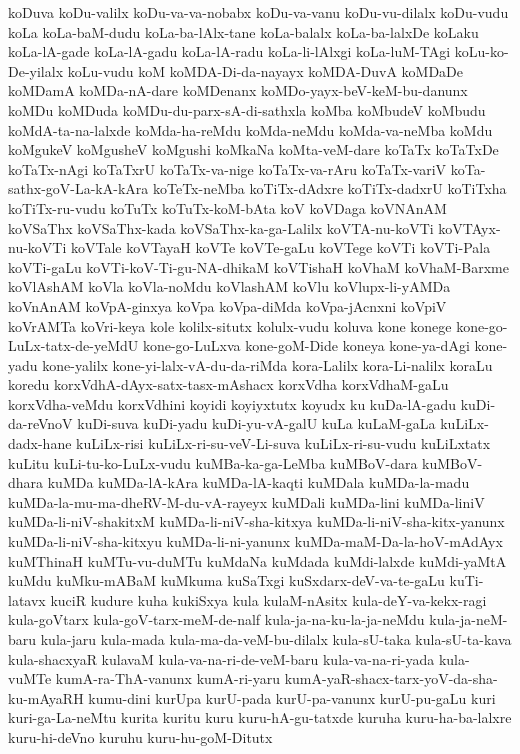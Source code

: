 {koDuva
koDu-valilx
koDu-va-va-nobabx
koDu-va-vanu
koDu-vu-dilalx
koDu-vudu
koLa
koLa-baM-dudu
koLa-ba-lAlx-tane
koLa-balalx
koLa-ba-lalxDe
koLaku
koLa-lA-gade
koLa-lA-gadu
koLa-lA-radu
koLa-li-lAlxgi
koLa-luM-TAgi
koLu-ko-De-yilalx
koLu-vudu
koM
koMDA-Di-da-nayayx
koMDA-DuvA
koMDaDe
koMDamA
koMDa-nA-dare
koMDenanx
koMDo-yayx-beV-keM-bu-danunx
koMDu
koMDuda
koMDu-du-parx-sA-di-sathxla
koMba
koMbudeV
koMbudu
koMdA-ta-na-lalxde
koMda-ha-reMdu
koMda-neMdu
koMda-va-neMba
koMdu
koMgukeV
koMgusheV
koMgushi
koMkaNa
koMta-veM-dare
koTaTx
koTaTxDe
koTaTx-nAgi
koTaTxrU
koTaTx-va-nige
koTaTx-va-rAru
koTaTx-variV
koTa-sathx-goV-La-kA-kAra
koTeTx-neMba
koTiTx-dAdxre
koTiTx-dadxrU
koTiTxha
koTiTx-ru-vudu
koTuTx
koTuTx-koM-bAta
koV
koVDaga
koVNAnAM
koVSaThx
koVSaThx-kada
koVSaThx-ka-ga-Lalilx
koVTA-nu-koVTi
koVTAyx-nu-koVTi
koVTale
koVTayaH
koVTe
koVTe-gaLu
koVTege
koVTi
koVTi-Pala
koVTi-gaLu
koVTi-koV-Ti-gu-NA-dhikaM
koVTishaH
koVhaM
koVhaM-Barxme
koVlAshAM
koVla
koVla-noMdu
koVlashAM
koVlu
koVlupx-li-yAMDa
koVnAnAM
koVpA-ginxya
koVpa
koVpa-diMda
koVpa-jAcnxni
koVpiV
koVrAMTa
koVri-keya
kole
kolilx-situtx
kolulx-vudu
koluva
kone
konege
kone-go-LuLx-tatx-de-yeMdU
kone-go-LuLxva
kone-goM-Dide
koneya
kone-ya-dAgi
kone-yadu
kone-yalilx
kone-yi-lalx-vA-du-da-riMda
kora-Lalilx
kora-Li-nalilx
koraLu
koredu
korxVdhA-dAyx-satx-tasx-mAshacx
korxVdha
korxVdhaM-gaLu
korxVdha-veMdu
korxVdhini
koyidi
koyiyxtutx
koyudx
ku
kuDa-lA-gadu
kuDi-da-reVnoV
kuDi-suva
kuDi-yadu
kuDi-yu-vA-galU
kuLa
kuLaM-gaLa
kuLiLx-dadx-hane
kuLiLx-risi
kuLiLx-ri-su-veV-Li-suva
kuLiLx-ri-su-vudu
kuLiLxtatx
kuLitu
kuLi-tu-ko-LuLx-vudu
kuMBa-ka-ga-LeMba
kuMBoV-dara
kuMBoV-dhara
kuMDa
kuMDa-lA-kAra
kuMDa-lA-kaqti
kuMDala
kuMDa-la-madu
kuMDa-la-mu-ma-dheRV-M-du-vA-rayeyx
kuMDali
kuMDa-lini
kuMDa-liniV
kuMDa-li-niV-shakitxM
kuMDa-li-niV-sha-kitxya
kuMDa-li-niV-sha-kitx-yanunx
kuMDa-li-niV-sha-kitxyu
kuMDa-li-ni-yanunx
kuMDa-maM-Da-la-hoV-mAdAyx
kuMThinaH
kuMTu-vu-duMTu
kuMdaNa
kuMdada
kuMdi-lalxde
kuMdi-yaMtA
kuMdu
kuMku-mABaM
kuMkuma
kuSaTxgi
kuSxdarx-deV-va-te-gaLu
kuTi-latavx
kuciR
kudure
kuha
kukiSxya
kula
kulaM-nAsitx
kula-deY-va-kekx-ragi
kula-goVtarx
kula-goV-tarx-meM-de-nalf
kula-ja-na-ku-la-ja-neMdu
kula-ja-neM-baru
kula-jaru
kula-mada
kula-ma-da-veM-bu-dilalx
kula-sU-taka
kula-sU-ta-kava
kula-shacxyaR
kulavaM
kula-va-na-ri-de-veM-baru
kula-va-na-ri-yada
kula-vuMTe
kumA-ra-ThA-vanunx
kumA-ri-yaru
kumA-yaR-shacx-tarx-yoV-da-sha-ku-mAyaRH
kumu-dini
kurUpa
kurU-pada
kurU-pa-vanunx
kurU-pu-gaLu
kuri
kuri-ga-La-neMtu
kurita
kuritu
kuru
kuru-hA-gu-tatxde
kuruha
kuru-ha-ba-lalxre
kuru-hi-deVno
kuruhu
kuru-hu-goM-Ditutx
}
